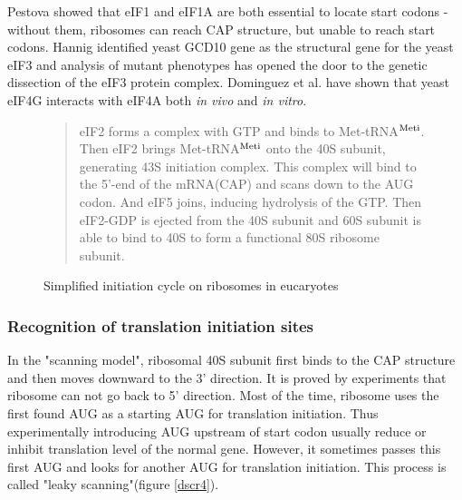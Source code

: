 Pestova\cite{label1120} showed that eIF1 and eIF1A are both essential to
locate start codons - without them, ribosomes can reach CAP structure,
but unable to reach start codons.  Hannig\cite{label24} identified yeast
GCD10 gene as the structural gene for the yeast eIF3 and analysis of
mutant phenotypes has opened the door to the genetic dissection of the
eIF3 protein complex. Dominguez et al.\cite{label1915} have shown that
yeast eIF4G interacts with eIF4A both {\it in vivo} and {\it in vitro}.

\begin{figure}
\begin{center}
\end{center}
\caption{Simplified initiation cycle on ribosomes in eucaryotes}
\begin{small}
\begin{quotation}

eIF2 forms a complex with GTP and binds to Met-tRNA$^{\rm Meti}$. Then
eIF2 brings Met-tRNA$^{\rm Meti}$ onto the 40S subunit, generating 43S
initiation complex. This complex will bind to the 5'-end of the
mRNA(CAP) and scans down to the AUG codon. And eIF5 joins, inducing
hydrolysis of the GTP. Then eIF2-GDP is ejected from the 40S subunit and
60S subunit is able to bind to 40S to form a functional 80S ribosome
subunit.

\end{quotation}
\end{small}
\end{figure}

\subsubsection{Recognition of translation initiation sites}

In the "scanning model", ribosomal 40S subunit first binds to the CAP
structure and then moves downward to the 3' direction.  It is proved by
experiments that ribosome can not go back to 5'
direction\cite{label1}. Most of the time, ribosome uses the first found
AUG as a starting AUG for translation initiation.  Thus experimentally
introducing AUG upstream of start codon usually reduce or inhibit
translation level of the normal gene\cite{label1112}. However, it
sometimes passes this first AUG and looks for another AUG for
translation initiation.  This process is called "leaky scanning"(figure
\ref{dscr4}).

